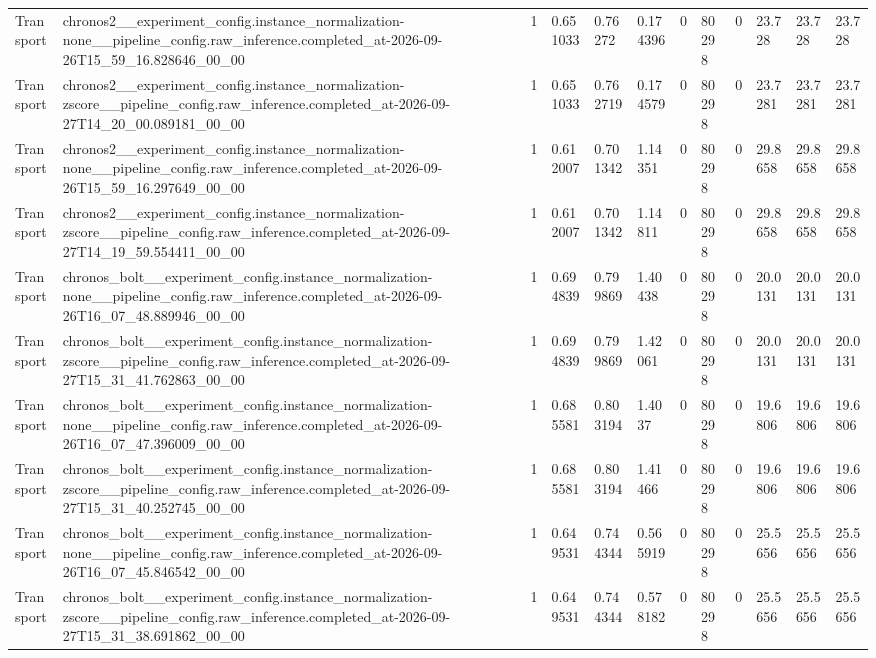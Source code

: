 \begin{tabular}{llllllllllll}
Transport & chronos2\_\_experiment\_config.instance\_normalization-none\_\_pipeline\_config.raw\_inference.completed\_at-2026-09-26T15\_59\_16.828646\_00\_00 & 1 & 0.651033 & 0.76272 & 0.174396 & 0 & 80298 & 0 & 23.728 & 23.728 & 23.728 \\
Transport & chronos2\_\_experiment\_config.instance\_normalization-zscore\_\_pipeline\_config.raw\_inference.completed\_at-2026-09-27T14\_20\_00.089181\_00\_00 & 1 & 0.651033 & 0.762719 & 0.174579 & 0 & 80298 & 0 & 23.7281 & 23.7281 & 23.7281 \\
Transport & chronos2\_\_experiment\_config.instance\_normalization-none\_\_pipeline\_config.raw\_inference.completed\_at-2026-09-26T15\_59\_16.297649\_00\_00 & 1 & 0.612007 & 0.701342 & 1.14351 & 0 & 80298 & 0 & 29.8658 & 29.8658 & 29.8658 \\
Transport & chronos2\_\_experiment\_config.instance\_normalization-zscore\_\_pipeline\_config.raw\_inference.completed\_at-2026-09-27T14\_19\_59.554411\_00\_00 & 1 & 0.612007 & 0.701342 & 1.14811 & 0 & 80298 & 0 & 29.8658 & 29.8658 & 29.8658 \\
Transport & chronos\_bolt\_\_experiment\_config.instance\_normalization-none\_\_pipeline\_config.raw\_inference.completed\_at-2026-09-26T16\_07\_48.889946\_00\_00 & 1 & 0.694839 & 0.799869 & 1.40438 & 0 & 80298 & 0 & 20.0131 & 20.0131 & 20.0131 \\
Transport & chronos\_bolt\_\_experiment\_config.instance\_normalization-zscore\_\_pipeline\_config.raw\_inference.completed\_at-2026-09-27T15\_31\_41.762863\_00\_00 & 1 & 0.694839 & 0.799869 & 1.42061 & 0 & 80298 & 0 & 20.0131 & 20.0131 & 20.0131 \\
Transport & chronos\_bolt\_\_experiment\_config.instance\_normalization-none\_\_pipeline\_config.raw\_inference.completed\_at-2026-09-26T16\_07\_47.396009\_00\_00 & 1 & 0.685581 & 0.803194 & 1.4037 & 0 & 80298 & 0 & 19.6806 & 19.6806 & 19.6806 \\
Transport & chronos\_bolt\_\_experiment\_config.instance\_normalization-zscore\_\_pipeline\_config.raw\_inference.completed\_at-2026-09-27T15\_31\_40.252745\_00\_00 & 1 & 0.685581 & 0.803194 & 1.41466 & 0 & 80298 & 0 & 19.6806 & 19.6806 & 19.6806 \\
Transport & chronos\_bolt\_\_experiment\_config.instance\_normalization-none\_\_pipeline\_config.raw\_inference.completed\_at-2026-09-26T16\_07\_45.846542\_00\_00 & 1 & 0.649531 & 0.744344 & 0.565919 & 0 & 80298 & 0 & 25.5656 & 25.5656 & 25.5656 \\
Transport & chronos\_bolt\_\_experiment\_config.instance\_normalization-zscore\_\_pipeline\_config.raw\_inference.completed\_at-2026-09-27T15\_31\_38.691862\_00\_00 & 1 & 0.649531 & 0.744344 & 0.578182 & 0 & 80298 & 0 & 25.5656 & 25.5656 & 25.5656 \\

\end{tabular}
